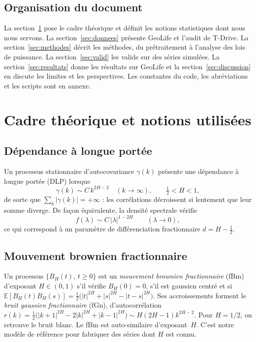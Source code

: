 \documentclass[11pt,a4paper]{article}
\newcommand{\E}{\mathbb{E}}
\renewcommand{\_}{\textunderscore\penalty0\hspace{0pt}}
\begin{document}
\subsection{Organisation du document}

La section~\ref{sec:theorie} pose le cadre théorique et définit les notions statistiques
dont nous nous servons. La section~\ref{sec:donnees} présente GeoLife et l'audit de
T-Drive. La section~\ref{sec:methodes} décrit les méthodes, du prétraitement à l'analyse des
lois de puissance. La section~\ref{sec:valid} les valide sur des séries simulées. La
section~\ref{sec:resultats} donne les résultats sur GeoLife et la
section~\ref{sec:discussion} en discute les limites et les perspectives. Les constantes du
code, les abréviations et les scripts sont en annexe.

\section{Cadre théorique et notions utilisées}
\label{sec:theorie}

\subsection{Dépendance à longue portée}

Un processus stationnaire d'autocovariance $\gamma(k)$ présente une dépendance à longue
portée (DLP) lorsque
\[
  \gamma(k)\sim C\,k^{2H-2}\quad(k\to\infty),\qquad \tfrac12<H<1,
\]
de sorte que $\sum_k|\gamma(k)|=+\infty$ : les corrélations décroissent si lentement que
leur somme diverge. De façon équivalente, la densité spectrale vérifie
\begin{equation}
  f(\lambda)\sim C\,|\lambda|^{1-2H}\qquad(\lambda\to0),
  \label{eq:spectre}
\end{equation}
ce qui correspond à un paramètre de différenciation fractionnaire $d=H-\tfrac12$.

\subsection{Mouvement brownien fractionnaire}

Un processus $\{B_H(t),\,t\ge0\}$ est un \emph{mouvement brownien fractionnaire} (fBm)
d'exposant $H\in(0,1)$ s'il vérifie $B_H(0)=0$, s'il est gaussien centré et si
$\E[B_H(t)B_H(s)]=\tfrac12\bigl(|t|^{2H}+|s|^{2H}-|t-s|^{2H}\bigr)$. Ses accroissements
forment le \emph{bruit gaussien fractionnaire} (fGn), d'autocorrélation
$r(k)=\tfrac12\bigl(|k+1|^{2H}-2|k|^{2H}+|k-1|^{2H}\bigr)\sim H(2H-1)k^{2H-2}$. Pour
$H=1/2$, on retrouve le bruit blanc. Le fBm est auto-similaire d'exposant~$H$. C'est notre
modèle de référence pour fabriquer des séries dont $H$ est connu.
\end{document}
